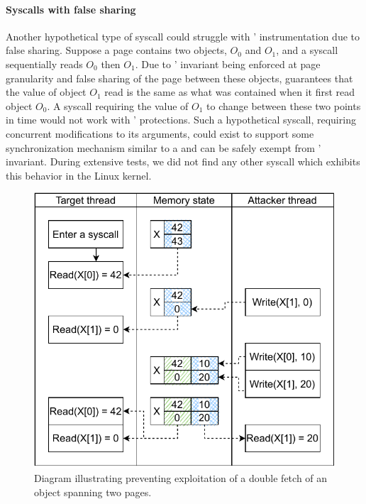 \paragraph{Syscalls with false sharing}
Another hypothetical type of syscall could struggle with \midas'
instrumentation due to false sharing.
Suppose a page contains two objects, $O_0$ and $O_1$, and a syscall
sequentially reads $O_0$ then $O_1$.
Due to \midas' invariant being enforced at page granularity and
false sharing of the page between these objects, \midas guarantees that
the value of object $O_1$ read is the same as what was contained when it
first read object $O_0$.
A syscall requiring the value of $O_1$ to change between these two
points in time would not work with \midas' protections.
Such a hypothetical syscall, requiring concurrent modifications to its
arguments, could exist to support some synchronization mechanism
similar to a  and can be safely exempt from \midas' invariant.
%
During extensive tests, we did not find any other syscall which exhibits this behavior in the
Linux kernel.


\begin{figure}[]
  \centering
  \includegraphics[width=0.7\linewidth]{media/midas/doublefetch_midas_twopages.pdf}
  \caption[Diagram illustrating \midas preventing multi-page double-fetch exploitation]
          {Diagram illustrating \midas preventing exploitation
          of a double fetch of an object  spanning two pages.}
  \label{fig:midas:copy_two_pages}
\end{figure}

